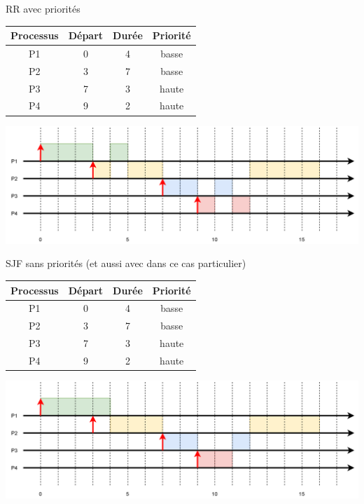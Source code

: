 \documentclass[10pt]{beamer}
\begin{document}
\begin{frame}{RR avec priorités}
\scriptsize
\begin{center}
\begin{tabular}{|c|c|c|c|}
\hline\rowcolor{beamerRed}
\textbf{\color{white} Processus} & \textbf{\color{white}Départ} & \textbf{\color{white}Durée} & \textbf{\color{white}Priorité} \\
\hline
P1 & 0 & 4 & basse \\
\hline
P2 & 3 & 7 & basse \\
\hline
P3 & 7 & 3 & haute \\
\hline
P4 & 9 & 2 & haute \\
\hline
\end{tabular}
\end{center}
\includegraphics[width=\linewidth]{img/RRP}
\end{frame}
\begin{frame}{SJF sans priorités (et aussi avec dans ce cas particulier)}
\scriptsize
\begin{center}
\begin{tabular}{|c|c|c|c|}
\hline\rowcolor{beamerRed}
\textbf{\color{white} Processus} & \textbf{\color{white}Départ} & \textbf{\color{white}Durée} & \textbf{\color{white}Priorité} \\
\hline
P1 & 0 & 4 & basse \\
\hline
P2 & 3 & 7 & basse \\
\hline
P3 & 7 & 3 & haute \\
\hline
P4 & 9 & 2 & haute \\
\hline
\end{tabular}
\end{center}
\includegraphics[width=\linewidth]{img/SJF}
\end{frame}
\end{document}
